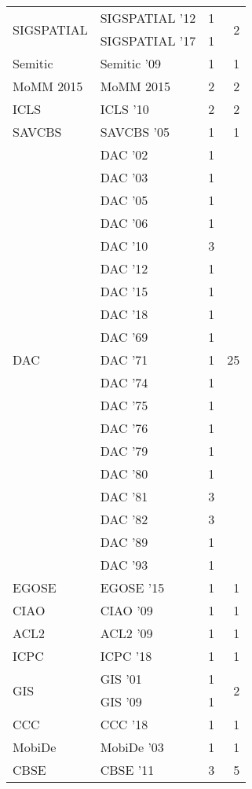 \begin{table*}[t]
\begin{tabular}{llrr}
\multirow{2}{*}{SIGSPATIAL } & SIGSPATIAL '12 & 1 & \multirow{2}{*}{2}\\
& SIGSPATIAL '17 & 1 &\\
\multirow{1}{*}{Semitic } & Semitic '09 & 1 & \multirow{1}{*}{1}\\
\multirow{1}{*}{MoMM 2015} & MoMM 2015 & 2 & \multirow{1}{*}{2}\\
\multirow{1}{*}{ICLS } & ICLS '10 & 2 & \multirow{1}{*}{2}\\
\multirow{1}{*}{SAVCBS } & SAVCBS '05 & 1 & \multirow{1}{*}{1}\\
\multirow{19}{*}{DAC } & DAC '02 & 1 & \multirow{19}{*}{25}\\
& DAC '03 & 1 &\\
& DAC '05 & 1 &\\
& DAC '06 & 1 &\\
& DAC '10 & 3 &\\
& DAC '12 & 1 &\\
& DAC '15 & 1 &\\
& DAC '18 & 1 &\\
& DAC '69 & 1 &\\
& DAC '71 & 1 &\\
& DAC '74 & 1 &\\
& DAC '75 & 1 &\\
& DAC '76 & 1 &\\
& DAC '79 & 1 &\\
& DAC '80 & 1 &\\
& DAC '81 & 3 &\\
& DAC '82 & 3 &\\
& DAC '89 & 1 &\\
& DAC '93 & 1 &\\
\multirow{1}{*}{EGOSE } & EGOSE '15 & 1 & \multirow{1}{*}{1}\\
\multirow{1}{*}{CIAO } & CIAO '09 & 1 & \multirow{1}{*}{1}\\
\multirow{1}{*}{ACL2 } & ACL2 '09 & 1 & \multirow{1}{*}{1}\\
\multirow{1}{*}{ICPC } & ICPC '18 & 1 & \multirow{1}{*}{1}\\
\multirow{2}{*}{GIS } & GIS '01 & 1 & \multirow{2}{*}{2}\\
& GIS '09 & 1 &\\
\multirow{1}{*}{CCC } & CCC '18 & 1 & \multirow{1}{*}{1}\\
\multirow{1}{*}{MobiDe } & MobiDe '03 & 1 & \multirow{1}{*}{1}\\
\multirow{3}{*}{CBSE } & CBSE '11 & 3 & \multirow{3}{*}{5}\\

\end{tabular}
\end{table*}
